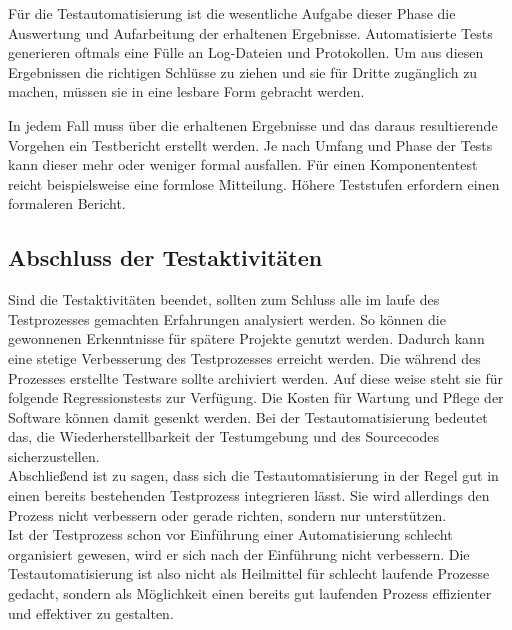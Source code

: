 Für die Testautomatisierung ist die wesentliche Aufgabe dieser Phase die Auswertung und Aufarbeitung der erhaltenen Ergebnisse. Automatisierte Tests generieren oftmals eine Fülle an Log-Dateien und Protokollen. Um aus diesen Ergebnissen die richtigen Schlüsse zu ziehen und sie für Dritte zugänglich zu machen, müssen sie in eine lesbare Form gebracht werden.

In jedem Fall muss über die erhaltenen Ergebnisse und das daraus resultierende Vorgehen ein Testbericht erstellt werden. Je nach Umfang und Phase der Tests kann dieser mehr oder weniger formal ausfallen. Für einen Komponententest reicht beispielsweise eine formlose Mitteilung. Höhere Teststufen erfordern einen formaleren Bericht.



\subsection{Abschluss der Testaktivitäten}
\label{subsec:abschluss_der_testaktivitäten}
Sind die Testaktivitäten beendet, sollten zum Schluss alle im laufe des Testprozesses gemachten Erfahrungen analysiert werden. So können die gewonnenen Erkenntnisse für spätere Projekte genutzt werden. Dadurch kann eine stetige Verbesserung des Testprozesses erreicht werden.
Die während des Prozesses erstellte Testware sollte archiviert werden. Auf diese weise steht sie für folgende Regressionstests zur Verfügung. Die Kosten für Wartung und Pflege der Software können damit gesenkt werden.
Bei der Testautomatisierung bedeutet das, die Wiederherstellbarkeit der Testumgebung und des Sourcecodes sicherzustellen.
\newline\\
Abschließend ist zu sagen, dass sich die Testautomatisierung in der Regel gut in einen bereits bestehenden Testprozess integrieren lässt. Sie wird allerdings \glqq den Prozess nicht verbessern oder gerade richten, sondern nur unterstützen.\grqq\ \cite[S.21]{seidl_basiswissen_2012} \\ Ist der Testprozess schon vor Einführung einer Automatisierung schlecht organisiert gewesen, wird er sich nach der Einführung nicht verbessern.
Die Testautomatisierung ist also nicht als Heilmittel für schlecht laufende Prozesse gedacht, sondern als Möglichkeit einen bereits gut laufenden Prozess effizienter und effektiver zu gestalten.

